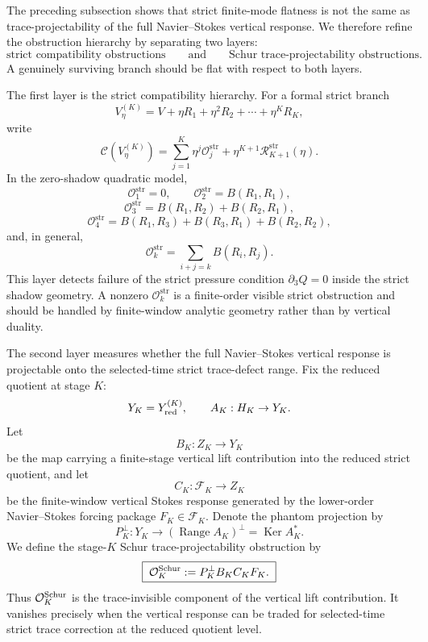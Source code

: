 \documentclass[11pt]{article}
\numberwithin{equation}{section}
\DeclareMathOperator{\Range}{Range}
\DeclareMathOperator{\Ker}{Ker}
\newcommand{\str}{\mathrm{str}}
\newcommand{\calC}{\mathcal C}
\newcommand{\calO}{\mathcal O}
\newcommand{\calR}{\mathcal R}
\begin{document}
The preceding subsection shows that strict finite-mode flatness is not the same as trace-projectability of the full Navier--Stokes vertical response.  We therefore refine the obstruction hierarchy by separating two layers:
\[
        \text{strict compatibility obstructions}
        \qquad\text{and}\qquad
        \text{Schur trace-projectability obstructions}.
\]
A genuinely surviving branch should be flat with respect to both layers.

The first layer is the strict compatibility hierarchy.  For a formal strict branch
\[
        V_\eta^{(K)}=V+\eta R_1+\eta^2R_2+\cdots+\eta^KR_K,
\]
write
\begin{equation}\label{eq:strict-expansion-v6}
        \calC(V_\eta^{(K)})
        =\sum_{j=1}^{K}\eta^j\calO_j^{\str}
        +\eta^{K+1}\calR_{K+1}^{\str}(\eta).
\end{equation}
In the zero-shadow quadratic model,
\[
        \calO_1^{\str}=0,
        \qquad
        \calO_2^{\str}=B(R_1,R_1),
\]
\[
        \calO_3^{\str}=B(R_1,R_2)+B(R_2,R_1),
\]
\[
        \calO_4^{\str}=B(R_1,R_3)+B(R_3,R_1)+B(R_2,R_2),
\]
and, in general,
\begin{equation}\label{eq:Ok-str-general}
        \calO_k^{\str}=\sum_{i+j=k}B(R_i,R_j).
\end{equation}
This layer detects failure of the strict pressure condition \(\partial_3Q=0\) inside the strict shadow geometry.  A nonzero \(\calO_k^{\str}\) is a finite-order visible strict obstruction and should be handled by finite-window analytic geometry rather than by vertical duality.

The second layer measures whether the full Navier--Stokes vertical response is projectable onto the selected-time strict trace-defect range.  Fix the reduced quotient at stage \(K\):
\[
        Y_K=Y_{\rm red}^{(K)},
        \qquad
        A_K:H_K\to Y_K.
\]
Let
\[
        B_K:Z_K\to Y_K
\]
be the map carrying a finite-stage vertical lift contribution into the reduced strict quotient, and let
\[
        C_K:\mathcal F_K\to Z_K
\]
be the finite-window vertical Stokes response generated by the lower-order Navier--Stokes forcing package \(F_K\in\mathcal F_K\).  Denote the phantom projection by
\[
        P_K^\perp:Y_K\to (\Range A_K)^\perp=\Ker A_K^*.
\]
We define the stage-\(K\) Schur trace-projectability obstruction by
\begin{equation}\label{eq:Schur-obstruction-v6}
        \boxed{\;
        \calO_K^{\rm Schur}:=P_K^\perp B_KC_KF_K.
        \;}
\end{equation}
Thus \(\calO_K^{\rm Schur}\) is the trace-invisible component of the vertical lift contribution.  It vanishes precisely when the vertical response can be traded for selected-time strict trace correction at the reduced quotient level.
\end{document}
